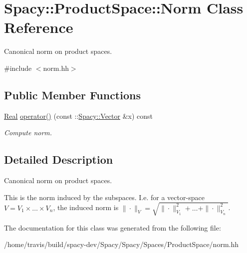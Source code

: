 \hypertarget{classSpacy_1_1ProductSpace_1_1Norm}{\section{\-Spacy\-:\-:\-Product\-Space\-:\-:\-Norm \-Class \-Reference}
\label{classSpacy_1_1ProductSpace_1_1Norm}
}


\-Canonical norm on product spaces.  




{\ttfamily \#include $<$norm.\-hh$>$}

\subsection*{\-Public \-Member \-Functions}
\begin{DoxyCompactItemize}
\item 
\hypertarget{classSpacy_1_1ProductSpace_1_1Norm_a2c5b998ea93fdfb5e3c0df5f436bbe05}{\hyperlink{classSpacy_1_1Real}{\-Real} \hyperlink{classSpacy_1_1ProductSpace_1_1Norm_a2c5b998ea93fdfb5e3c0df5f436bbe05}{operator()} (const \-::\hyperlink{classSpacy_1_1Vector}{\-Spacy\-::\-Vector} \&x) const }\label{classSpacy_1_1ProductSpace_1_1Norm_a2c5b998ea93fdfb5e3c0df5f436bbe05}

\begin{DoxyCompactList}\small\item\em \-Compute norm. \end{DoxyCompactList}\end{DoxyCompactItemize}


\subsection{\-Detailed \-Description}
\-Canonical norm on product spaces. 

\-This is the norm induced by the subspaces. \-I.\-e. for a vector-\/space $V=V_1 \times \ldots \times V_n $, the induced norm is $\|\cdot\|_V=\sqrt{\|\cdot\|^2_{V_1} + \ldots + \|\cdot\|^2_{V_n}}$. 

\-The documentation for this class was generated from the following file\-:\begin{DoxyCompactItemize}
\item 
/home/travis/build/spacy-\/dev/\-Spacy/\-Spacy/\-Spaces/\-Product\-Space/norm.\-hh\end{DoxyCompactItemize}
